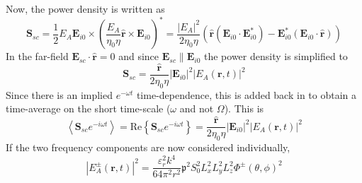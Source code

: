 \documentclass[10pt,a4paper]{eitExjobb}
\begin{document}
	Now, the power density is written as
	\begin{equation*}
	\bm{S}_{sc} = \frac{1}{2} E_A \bm{E}_{i0} \times \left( \frac{E_A}{ \eta_0 \eta} \bm{\hat{r}} \times \bm{E}_{i0} \right)^* = \frac{|E_A|^2}{2\eta_0 \eta} \left( \bm{\hat{r}} (\bm{E}_{i0} \cdot \bm{E}_{i0}^*) - \bm{E}_{i0}^* (\bm{E}_{i0} \cdot \bm{\hat{r}}) \right)
	\end{equation*}
	In the far-field $\bm{E}_{sc} \cdot \bm{\hat{r}} = 0$ and since $\bm{E}_{sc} \parallel \bm{E}_{i0}$ the power density is simplified to
	\begin{equation*}
	\bm{S}_{sc} = \frac{\bm{\hat{r}}}{2\eta_0 \eta} |\bm{E}_{i0}|^2 |E_A (\bm{r},t)|^2
	\end{equation*}
	Since there is an implied $e^{-\omega t}$ time-dependence, this is added back in to obtain a time-average on the short time-scale ($\omega$ and not $\Omega$). This is
	\begin{equation*}
	\left< \bm{S}_{sc} e^{-i\omega t} \right> = \mathrm{Re}\left\{ \bm{S}_{sc} e^{-i\omega t} \right\} = \frac{\bm{\hat{r}}}{2\eta_0 \eta} |\bm{E}_{i0}|^2 |E_A (\bm{r},t)|^2
	\end{equation*}
	If the two frequency components are now considered individually,
	\begin{equation*}
	|E_A^\pm (\bm{r},t)|^2 =\frac{\varepsilon_r^2 k^4}{64 \pi^2 r^2} \mathfrak{p}^2 S_0^2 L_x^2 L_y^2 L_z^2 \Phi^\pm (\theta,\phi)^2
	\end{equation*}
	
\end{document}
